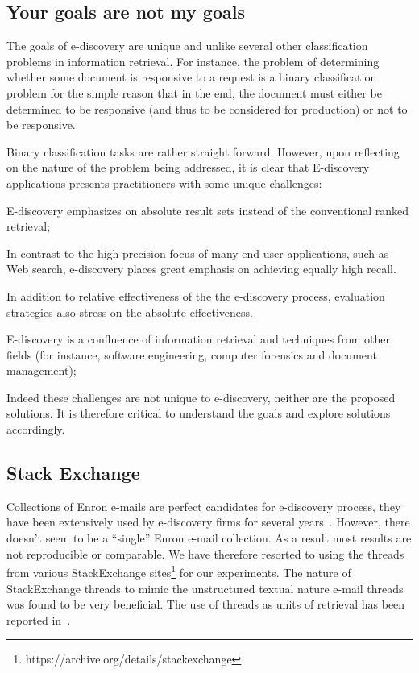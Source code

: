 \documentclass{sig-alternate-05-2015}
\newcommand{\be}{\begin{enumerate*}}
\newcommand{\ee}{\end{enumerate*}}
\begin{document}
\subsection{Your goals are not my goals}
The goals of e-discovery are unique and unlike several other classification problems in information retrieval. For instance, the problem of determining whether some document is responsive to a request is a binary classification problem for the simple reason that in the end, the document must either be determined to be responsive (and thus to be considered for production) or not to be responsive. 

Binary classification tasks are rather straight forward. However, upon reflecting on the nature of the problem being addressed, it is clear that E-discovery applications presents practitioners with some unique challenges: 
\be
\item  E-discovery emphasizes on absolute result sets instead of the conventional ranked retrieval; 
\item  In contrast to the high-precision focus of many end-user applications, such as Web search, e-discovery places great emphasis on achieving equally high recall.
\item  In addition to relative effectiveness of the the e-discovery process, evaluation strategies also stress on the absolute effectiveness. 
\item  E-discovery is a confluence of information retrieval and techniques from other fields (for instance, software engineering, computer forensics and document management); 
\ee

Indeed these challenges are not unique to e-discovery, neither are the proposed solutions. It is therefore critical to understand the goals and explore solutions accordingly.

\subsection{Stack Exchange}
Collections of Enron e-mails are perfect candidates for e-discovery process, they have been extensively used by e-discovery firms for several years~\cite{oard2013}. However, there doesn't seem to be a ``single'' Enron e-mail collection. As a result most results are not reproducible or comparable. We have therefore resorted to using the threads from various StackExchange sites\footnote{https://archive.org/details/stackexchange} for our experiments. The nature of StackExchange threads to mimic the unstructured textual nature e-mail threads was found to be very beneficial. The use of threads as units of retrieval has been reported in~\cite{elsayed08}.
\end{document}
